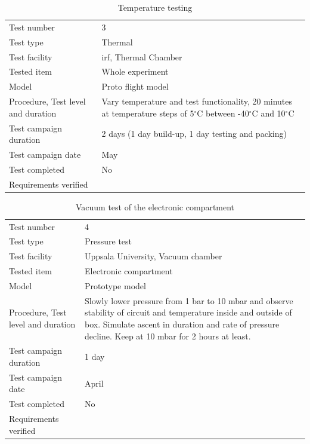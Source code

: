\documentclass[12pt,a4paper]{report}
\newcommand{\degree}{\ensuremath{^\circ}}
\begin{document}
\begin{table}[H]
\centering
\caption{Temperature testing}
\label{tab:test3}
\begin{tabular}{L{5cm}L{10cm}}
\toprule
Test number & 3 \\
Test type & Thermal \\
Test facility & \ac{irf}, Thermal Chamber \\
Tested item & Whole experiment \\
Model & Proto flight model \\
Procedure, Test level and duration & Vary temperature and test functionality, 20 minutes at temperature steps of 5\degree C between -40\degree C and 10\degree C \\
Test campaign duration & 2 days (1 day build-up, 1 day testing and packing) \\
Test campaign date & May \\
Test completed & No \\
Requirements verified & \\
\bottomrule
\end{tabular}
\end{table}

\begin{table}[H]
\centering
\caption{Vacuum test of the electronic compartment}
\label{tab:test2}
\begin{tabular}{L{5cm}L{10cm}}
\toprule
Test number & 4 \\
Test type & Pressure test \\
Test facility & Uppsala University, Vacuum chamber \\
Tested item & Electronic compartment \\
Model & Prototype model \\
Procedure, Test level and duration & Slowly lower pressure from 1 bar to 10 mbar and observe stability of circuit and temperature inside and outside of box. Simulate ascent in duration and rate of pressure decline. Keep at 10 mbar for 2 hours at least. \\
Test campaign duration & 1 day \\
Test campaign date & April \\
Test completed & No \\
Requirements verified & \\
\bottomrule
\end{tabular}
\end{table}
\end{document}
